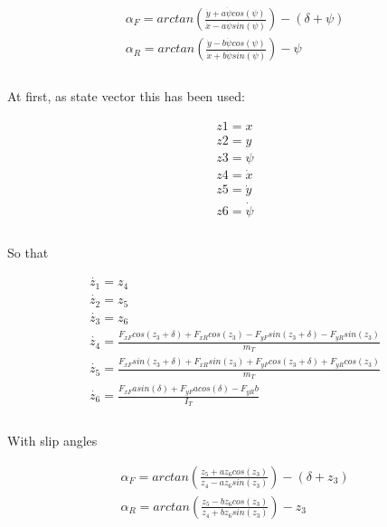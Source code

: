 \documentclass{report}
\begin{document}
\begin{equation}
\begin{aligned}
\alpha_F = arctan(\frac{\dot{y}+a\dot{\psi}cos(\psi)}{\dot{x}-a\dot{\psi}sin(\psi)}) - (\delta + \psi)\\
\alpha_R = arctan(\frac{\dot{y}-b\dot{\psi}cos(\psi)}{\dot{x}+b\dot{\psi}sin(\psi)}) - \psi\\\\
\end{aligned}
\end{equation}

At first, as state vector this has been used:

\begin{equation}
\begin{aligned}
z1 = x\\
z2 = y\\
z3 = \psi\\
z4 = \dot{x}\\
z5 = \dot{y}\\
z6 = \dot{\psi}\\\\
\end{aligned}
\end{equation}

So that

\begin{equation}
\begin{aligned}
\dot{z_1} = z_4 \\
\dot{z_2} = z_5 \\
\dot{z_3} = z_6 \\
\dot{z_4} = \frac{F_{xF} cos(z_3+\delta) + F_{xR} cos(z_3) - F_{yF} sin(z_3+\delta) - F_{yR} sin(z_3)}{m_T} \\
\dot{z_5} = \frac{F_{xF} sin(z_3+\delta) + F_{xR} sin(z_3) + F_{yF} cos(z_3+\delta) + F_{yR} cos(z_3)}{m_T} \\
\dot{z_6} = \frac{F_{xF} a sin(\delta) + F_{yF} a cos(\delta) - F_{yR} b}{I_T} \\\\
\end{aligned}
\end{equation}

With slip angles

\begin{equation}
\begin{aligned}
\alpha_F = arctan(\frac{z_5+a z_6 cos(z_3)}{z_4-a z_6 sin(z_3)}) - (\delta + z_3)\\
\alpha_R = arctan(\frac{z_5-b z_6 cos(z_3)}{z_4+b z_6 sin(z_3)}) - z_3\\\\
\end{aligned}
\end{equation}
\end{document}
